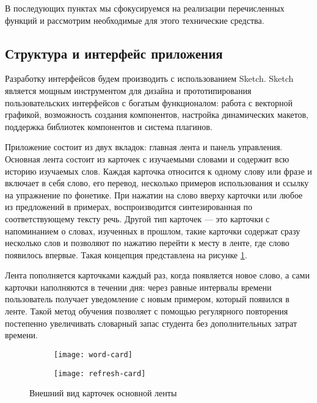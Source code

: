 В последующих пунктах мы сфокусируемся на реализации перечисленных функций и рассмотрим необходимые для этого технические средства.

\subsection{Структура и интерфейс приложения}
Разработку интерфейсов будем производить с использованием Sketch. Sketch является мощным инструментом для дизайна и прототипирования пользовательских интерфейсов с богатым функционалом: работа с векторной графикой, возможность создания компонентов, настройка динамических макетов, поддержка библиотек компонентов и система плагинов.

Приложение состоит из двух вкладок: главная лента и панель управления. Основная лента состоит из карточек с изучаемыми словами и содержит всю историю изучаемых слов. Каждая карточка относится к одному слову или фразе и включает в себя слово, его перевод, несколько примеров использования и ссылку на упражнение по фонетике. При нажатии на слово вверху карточки или любое из предложений в примерах, воспроизводится синтезированная по соответствующему тексту речь. Другой тип карточек --- это карточки с напоминанием о словах, изученных в прошлом, такие карточки содержат сразу несколько слов и позволяют по нажатию перейти к месту в ленте, где слово появилось впервые. Такая концепция представлена на рисунке \ref{fig:word-cards}.

Лента пополняется карточками каждый раз, когда появляется новое слово, а сами карточки наполняются в течении дня: через равные интервалы времени пользователь получает уведомление с новым примером, который появился в ленте. Такой метод обучения позволяет с помощью регулярного повторения постепенно увеличивать словарный запас студента без дополнительных затрат времени.

\begin{figure}[h]
	\centering
	\begin{subfigure}{0.3\textwidth}
		\centering
		\texttt{[image: word-card]}
	\end{subfigure}
	\hspace{0.2\textwidth}
	\begin{subfigure}{0.3\textwidth}
		\centering
		\texttt{[image: refresh-card]}
	\end{subfigure}
	\caption{Внешний вид карточек основной ленты}
	\label{fig:word-cards}
\end{figure}

